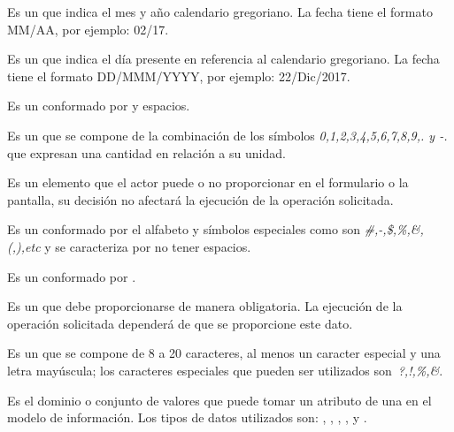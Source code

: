 \begin{description}
     Es un  que indica el mes y año calendario gregoriano. La fecha tiene el formato MM/AA, por ejemplo: 02/17.
     
     Es un  que indica el día presente en referencia al calendario gregoriano. La fecha tiene el formato DD/MMM/YYYY, por ejemplo: 22/Dic/2017.

     Es un   conformado por  y espacios.
    
     Es un  que se compone de la combinación de los símbolos \textit{0,1,2,3,4,5,6,7,8,9,. y -.}  que expresan una cantidad en relación a su unidad.
    
     Es un elemento que el actor puede o no proporcionar en el formulario o la pantalla, su decisión no afectará la ejecución de la operación solicitada.

     Es un   conformado por el alfabeto y símbolos especiales como son \textit{\#,-,\$,\%,\&,(,),etc} y se caracteriza por no tener espacios.
    
     Es un  conformado por .

     Es un  que debe proporcionarse de manera obligatoria. La ejecución de la operación solicitada dependerá de que se proporcione este dato.
    
     Es un  que se compone de 8 a 20 caracteres, al menos un caracter especial y una letra mayúscula; los caracteres especiales que pueden ser utilizados son \textit{\,?,!,\%,\&}.
    

     Es el dominio o conjunto de valores que puede tomar un atributo de una  en el modelo de información. Los tipos de datos utilizados son: , , , ,  y .
    

\end{description}


